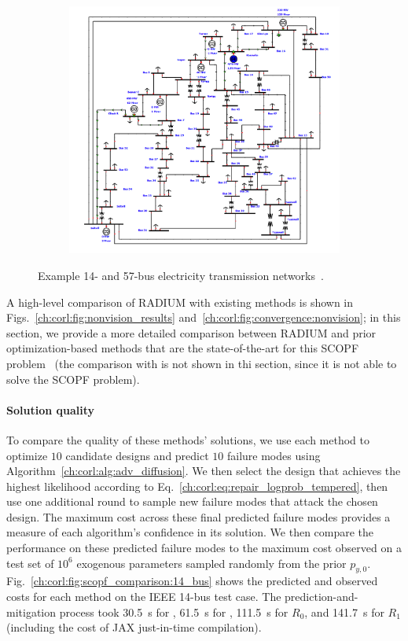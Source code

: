 \begin{figure}[tb]
\begin{subfigure}[t]{0.4\linewidth}
        \includegraphics[width=\linewidth]{images/global_methods/IEEE57.png}
    \end{subfigure}%
    \caption{Example 14- and 57-bus electricity transmission networks~\cite{illinoiscenterforasmarterelectricgridIEEE57BusSystem}.}
    \label{ch:corl:fig:networks}
\end{figure}

A high-level comparison of RADIUM with existing methods is shown in Figs.~\ref{ch:corl:fig:nonvision_results} and~\ref{ch:corl:fig:convergence:nonvision}; in this section, we provide a more detailed comparison between RADIUM and prior optimization-based methods that are the state-of-the-art for this SCOPF problem~\cite{dontiAdversariallyRobustLearning2021} (the comparison with \ltc{} is not shown in thi section, since it is not able to solve the SCOPF problem).

\paragraph{Solution quality} To compare the quality of these methods' solutions, we use each method to optimize $10$ candidate designs and predict $10$ failure modes using Algorithm~\ref{ch:corl:alg:adv_diffusion}. We then select the design that achieves the highest likelihood according to Eq.~\eqref{ch:corl:eq:repair_logprob_tempered}, then use one additional round to sample new failure modes that attack the chosen design. The maximum cost across these final predicted failure modes provides a measure of each algorithm's confidence in its solution. We then compare the performance on these predicted failure modes to the maximum cost observed on a test set of $10^6$ exogenous parameters sampled randomly from the prior $p_{y, 0}$. Fig.~\ref{ch:corl:fig:scopf_comparison:14_bus} shows the predicted and observed costs for each method on the IEEE 14-bus test case. The prediction-and-mitigation process took \SI{30.5}{s} for \gdr{}, \SI{61.5}{s} for \gda{}, \SI{111.5}{s} for $R_0$, and \SI{141.7}{s} for $R_1$ (including the cost of JAX just-in-time compilation).

